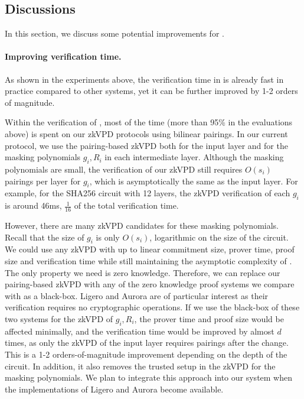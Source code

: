 \subsection{Discussions}\label{subsec::discuss}

In this section, we discuss some potential improvements for \name.


\paragraph{Improving verification time.} As shown in the experiments above, the verification time in \name is already fast in practice compared to other systems, yet it can be further improved by 1-2 orders of magnitude. 

Within the verification of \name, most of the time (more than 95\% in the evaluations above) is spent on our zkVPD protocols using bilinear pairings. In our current protocol, we use the pairing-based zkVPD both for the input layer and for the masking polynomials $g_i, R_i$ in each intermediate layer. Although the masking polynomials are small, the verification of our zkVPD still requires $O(s_i)$ pairings per layer for $g_i$, which is asymptotically the same as the input layer. For example, for the SHA256 circuit with 12 layers, the zkVPD verification of each $g_i$ is around 46ms, $\frac{1}{16}$ of the total verification time.

However, there are many zkVPD candidates for these masking polynomials. Recall that the size of $g_i$ is only $O(s_i)$, logarithmic on the size of the circuit. We could use any zkVPD with up to linear commitment size, prover time, proof size and verification time while still maintaining the asymptotic complexity of \name. The only property we need is zero knowledge. Therefore, we can replace our pairing-based zkVPD with any of the zero knowledge proof systems we compare with as a black-box. \textsf{Ligero} and \textsf{Aurora} are of particular interest as their verification requires no cryptographic operations. If we use the black-box of these two systems for the zkVPD of $g_i, R_i$, the prover time and proof size would be affected minimally, and the verification time would be improved by almost $d$ times, as only the zkVPD of the input layer requires pairings after the change. This is a 1-2 orders-of-magnitude improvement depending on the depth of the circuit. In addition, it also removes the trusted setup in the zkVPD for the masking polynomials. We plan to integrate this approach into our system when the implementations of \textsf{Ligero} and \textsf{Aurora} become available.  


